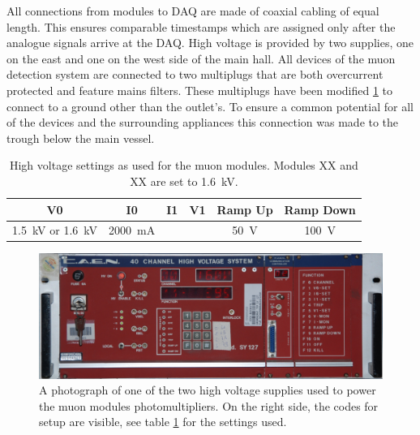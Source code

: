   All connections from modules to DAQ are made of coaxial cabling of equal length. This ensures comparable timestamps which are assigned only after the analogue signals arrive at the DAQ. High voltage is provided by two supplies, one on the east and one on the west side of the main hall.
  All devices of the muon detection system are connected to two multiplugs that are both overcurrent protected and feature mains filters. These multiplugs have been modified \ref{fig:multiplug} to connect to a ground other than the outlet's. To ensure a common potential for all of the devices and the surrounding appliances this connection was made to the trough below the main vessel.
  \begin{table}
  \centering
  	\begin{tabular}{|c|c|c|c|c|c|}
  	\hline
  		V0 & I0 & I1 & V1 & Ramp Up & Ramp Down\\
  		\hline
  		\SI{1.5}{\kilo\volt} or \SI{1.6}{\kilo\volt} & \SI{2000}{\milli\ampere} & & & \SI{50}{\volt} & \SI{100}{\volt}\\
  		\hline
  	\end{tabular}
  	\caption[High voltage settings]{High voltage settings as used for the muon modules. Modules XX and XX are set to \SI{1.6}{\kilo\volt}.}
  	\label{tab:HVSettings}
  \end{table}

  \begin{figure}
  \centering
  
  	\includegraphics[width = \textwidth]{graphics/muonModules/mainSpec/HV.jpg}
  \caption[High voltage supplies]{A photograph of one of the two high voltage supplies used to power the muon modules photomultipliers. On the right side, the codes for setup are visible, see table \ref{tab:HVSettings} for the settings used.}
  \label{fig:multiplug}
  \end{figure}



